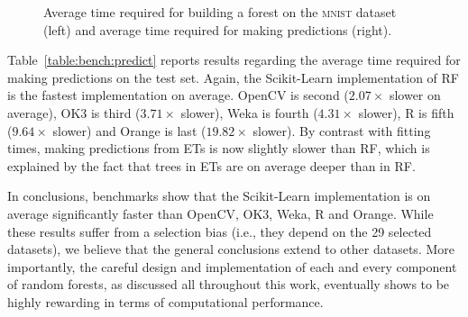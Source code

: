 \begin{figure}
\hspace{-1.5cm}
\caption{Average time required for building a forest on the \textsc{mnist} dataset (left) and average time required for making predictions (right).}
\label{fig:5:benchmarks:mnist}
\end{figure}

Table~\ref{table:bench:predict} reports results regarding the average time
required for making predictions on the test set. Again, the Scikit-Learn implementation of RF is the
fastest implementation on average. OpenCV is second ($2.07\times$ slower on
average), OK3 is third ($3.71\times$ slower), Weka is fourth ($4.31\times$
slower), R is fifth ($9.64\times$ slower) and Orange is last ($19.82\times$
slower). By contrast with fitting times, making predictions from ETs is now
slightly slower than RF, which is explained by the fact that trees in ETs
are on average deeper than in RF.

In conclusions, benchmarks show that the Scikit-Learn implementation is on
average significantly faster than OpenCV, OK3, Weka, R and Orange.  While these
results suffer from a selection bias (i.e., they depend on the 29 selected
datasets), we believe that the general conclusions extend to other datasets.
More importantly, the careful design and implementation of  each and every
component of random forests, as discussed all throughout this work, eventually
shows to be highly rewarding in terms of computational performance.

